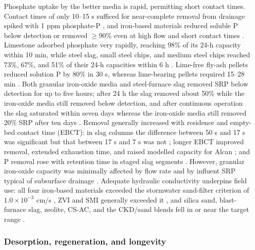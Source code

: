 \documentclass[11pt]{article}
\begin{document}
Phosphate uptake by the better media is rapid, permitting short contact times. Contact times of only 10--15 s sufficed for near-complete removal from drainage spiked with 1 ppm phosphate-P \parencite{Allred2017}, and iron-based materials reduced soluble P below detection or removed $\geq$90\% even at high flow and short contact times \parencite{Allred2014}. Limestone adsorbed phosphate very rapidly, reaching 98\% of its 24-h capacity within 10 min, while steel slag, small steel chips, and medium steel chips reached 73\%, 67\%, and 51\% of their 24-h capacities within 6 h \parencite{Sellner2019b}. Lime-free fly-ash pellets reduced solution P by 80\% in 30 s, whereas lime-bearing pellets required 15--28 min \parencite{Li2017}. Both granular iron-oxide media and steel-furnace slag removed SRP below detection for up to five hours; after 24 h the slag removed about 50\% while the iron-oxide media still removed below detection, and after continuous operation the slag saturated within seven days whereas the iron-oxide media still removed 20\% SRP after ten days \parencite{Hauda2020}. Removal generally increased with residence and empty-bed contact time (EBCT): in slag columns the difference between 50 s and 17 s was significant but that between 17 s and 7 s was not \parencite{Sanford2016}; longer EBCT improved removal, extended exhaustion time, and raised modelled capacity for Alcan \parencite{Kumari2025}; and P removal rose with retention time in staged slag segments \parencite{Wang2020d}. However, granular iron-oxide capacity was minimally affected by flow rate and by influent SRP typical of subsurface drainage \parencite{Hauda2020}. Adequate hydraulic conductivity underpins field use: all four iron-based materials exceeded the stormwater sand-filter criterion of $1.0\times10^{-3}$ cm/s \parencite{Allred2014}, ZVI and SMI generally exceeded it \parencite{Allred2012}, and silica sand, blast-furnace slag, zeolite, CS-AC, and the CKD/sand blends fell in or near the target range \parencite{Agrawal2011}.

\subsubsection{Desorption, regeneration, and longevity}
\end{document}
